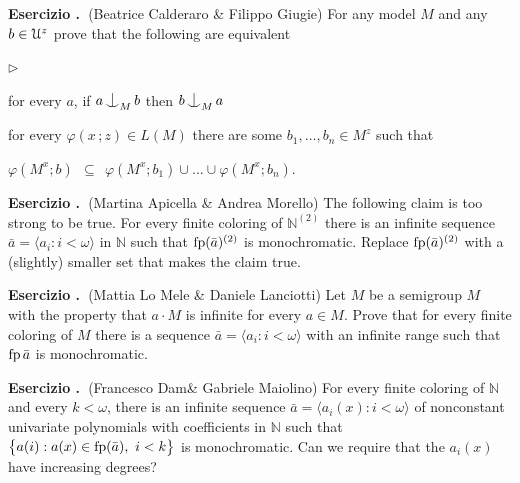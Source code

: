 \documentclass[10pt]{article}
\def\phi{\varphi}
\def\U{\EuScript U}
\def\NN{\mathds N}
\def\<{\langle}
\def\>{\rangle}
\def\fp{{\rm fp}}
\def\nonfork{\mathop{\raise0.2ex\hbox{\ooalign{\hidewidth$\vert$\hidewidth\cr\raise-0.9ex\hbox{$\smile$}}}}}
\newcommand{\labella}[1]{{\sf\footnotesize #1}\hfill}
\renewenvironment{itemize}
  {\begin{list}{$\triangleright$}{%
   \setlength{\parskip}{0mm}
   \setlength{\topsep}{0mm}
   \setlength{\rightmargin}{0mm}
   \setlength{\listparindent}{0mm}
   \setlength{\itemindent}{0mm}
   \setlength{\labelwidth}{3ex}
   \setlength{\itemsep}{0mm}
   \setlength{\parsep}{0mm}
   \setlength{\partopsep}{0mm}
   \setlength{\labelsep}{1ex}
   \setlength{\leftmargin}{\labelwidth+\labelsep}
   \let\makelabel\labella}}{%
   \vspace*{-.3\baselineskip}
  \end{list}}
\newcounter{ex}
\newenvironment{exercise}{\bigskip\addtocounter{ex}{1}\textbf{Esercizio \theex.\ }}{}
\begin{document}
\begin{exercise}(Beatrice Calderaro \& Filippo Giugie)
 For any model $M$ and any $b\in\U^z$ prove that the following are equivalent
  \begin{itemize}
    \item [1.] for every $a$, if $a\nonfork_Mb$ then $b\nonfork_Ma$
    \item [2.] for every $\phi(x\,;z)\in L(M)$ there are some $b_1,\dots,b_n\in M^z$ such that \smallskip
    
     \hfil $\phi(M^x;b)\ \ \subseteq\ \ \phi(M^x;b_1)\cup\dots\cup\phi(M^x;b_n).$
  \end{itemize}
\end{exercise}

\begin{exercise}(Martina Apicella \& Andrea Morello)
  The following claim is too strong to be true.
  For every finite coloring of $\NN^{(2)}$ there is an infinite sequence $\bar a=\langle a_i:i<\omega\rangle$ in $\NN$ such that $\fp(\bar a)^{(2)}$ is monochromatic.
  Replace $\fp(\bar a)^{(2)}$ with a (slightly) smaller set that makes the claim true.
\end{exercise}

\begin{exercise}(Mattia Lo Mele \& Daniele Lanciotti)
  Let $M$ be a semigroup $M$ with the property that $a\cdot M$ is infinite for every $a\in M$.
  Prove that for every finite coloring of $M$ 
  there is a sequence $\bar a=\langle a_i:i<\omega\rangle$ with an infinite range such that $\fp\,\bar a$ is monochromatic.
\end{exercise}

\begin{exercise}(Francesco Dam\&	Gabriele Maiolino)
  For every finite coloring of $\NN$ and every $k<\omega$, 
  there is an infinite sequence $\bar a=\<a_i(x):i<\omega\>$ of nonconstant univariate polynomials with coefficients in $\NN$ such that $\big\{a(i): a(x)\in\fp(\bar a),\ i<k\big\}$ is monochromatic.
  Can we require that the $a_i(x)$ have increasing degrees?
\end{exercise}
\end{document}
